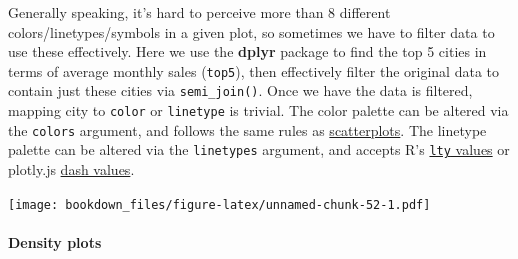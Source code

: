 \documentclass[12pt,]{isuthesis}
\newenvironment{Shaded}{\begin{snugshade}}{\end{snugshade}}
\newcommand{\KeywordTok}[1]{\textcolor[rgb]{0.13,0.29,0.53}{\textbf{{#1}}}}
\newcommand{\DataTypeTok}[1]{\textcolor[rgb]{0.13,0.29,0.53}{{#1}}}
\newcommand{\DecValTok}[1]{\textcolor[rgb]{0.00,0.00,0.81}{{#1}}}
\newcommand{\StringTok}[1]{\textcolor[rgb]{0.31,0.60,0.02}{{#1}}}
\newcommand{\OtherTok}[1]{\textcolor[rgb]{0.56,0.35,0.01}{{#1}}}
\newcommand{\NormalTok}[1]{{#1}}
\let\oldparagraph\paragraph
\renewcommand{\paragraph}[1]{\oldparagraph{#1}\mbox{}}
\begin{document}
Generally speaking, it's hard to perceive more than 8 different
colors/linetypes/symbols in a given plot, so sometimes we have to filter
data to use these effectively. Here we use the \textbf{dplyr} package to
find the top 5 cities in terms of average monthly sales (\texttt{top5}),
then effectively filter the original data to contain just these cities
via \texttt{semi\_join()}. Once we have the data is filtered, mapping
city to \texttt{color} or \texttt{linetype} is trivial. The color
palette can be altered via the \texttt{colors} argument, and follows the
same rules as \protect\hyperlink{scatterplots}{scatterplots}. The
linetype palette can be altered via the \texttt{linetypes} argument, and
accepts R's
\href{https://github.com/wch/r-source/blob/e5b21d0397c607883ff25cca379687b86933d730/src/library/graphics/man/par.Rd\#L726-L743}{\texttt{lty}
values} or plotly.js
\href{https://plot.ly/r/reference/\#scatter-line-dash}{dash values}.

\begin{Shaded}
\end{Shaded}

\texttt{[image: bookdown\_files/figure-latex/unnamed-chunk-52-1.pdf]}

\paragraph{Density plots}\label{density-plots-1}
\end{document}

